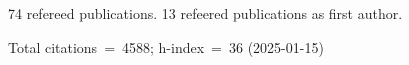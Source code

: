 74 refereed publications. 13 refeered publications as first author.

Total citations~=~4588; h-index~=~36 (2025-01-15)